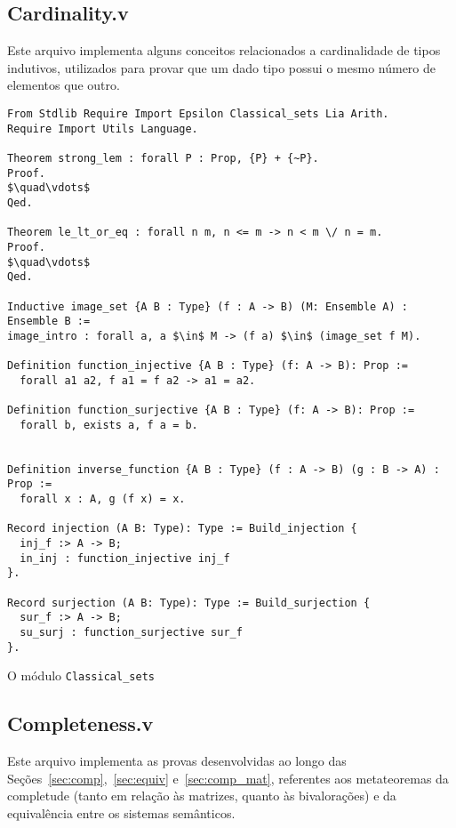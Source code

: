     \subsection{Cardinality.v}\label{sec:cardinality}

        Este arquivo implementa alguns conceitos relacionados a cardinalidade de tipos indutivos, utilizados para provar que um dado tipo possui o mesmo número de elementos que outro.

        \begin{lstlisting}[name=LFI, frame=single, language=coq]
From Stdlib Require Import Epsilon Classical_sets Lia Arith.
Require Import Utils Language.

Theorem strong_lem : forall P : Prop, {P} + {~P}.
Proof.
$\quad\vdots$
Qed. 

Theorem le_lt_or_eq : forall n m, n <= m -> n < m \/ n = m.
Proof.
$\quad\vdots$
Qed.

Inductive image_set {A B : Type} (f : A -> B) (M: Ensemble A) : Ensemble B :=
image_intro : forall a, a $\in$ M -> (f a) $\in$ (image_set f M).

Definition function_injective {A B : Type} (f: A -> B): Prop :=
  forall a1 a2, f a1 = f a2 -> a1 = a2.

Definition function_surjective {A B : Type} (f: A -> B): Prop :=
  forall b, exists a, f a = b.

  
Definition inverse_function {A B : Type} (f : A -> B) (g : B -> A) : Prop :=
  forall x : A, g (f x) = x.

Record injection (A B: Type): Type := Build_injection {
  inj_f :> A -> B;
  in_inj : function_injective inj_f
}.

Record surjection (A B: Type): Type := Build_surjection {
  sur_f :> A -> B;
  su_surj : function_surjective sur_f
}.
          \end{lstlisting}

          O módulo \texttt{Classical\_sets} 
    
    \subsection{Completeness.v}\label{sec:completeness}
        
        Este arquivo implementa as provas desenvolvidas ao longo das Seções~\ref{sec:comp},~\ref{sec:equiv} e~\ref{sec:comp_mat}, referentes aos metateoremas da completude (tanto em relação às matrizes, quanto às bivalorações) e da equivalência entre os sistemas semânticos.

